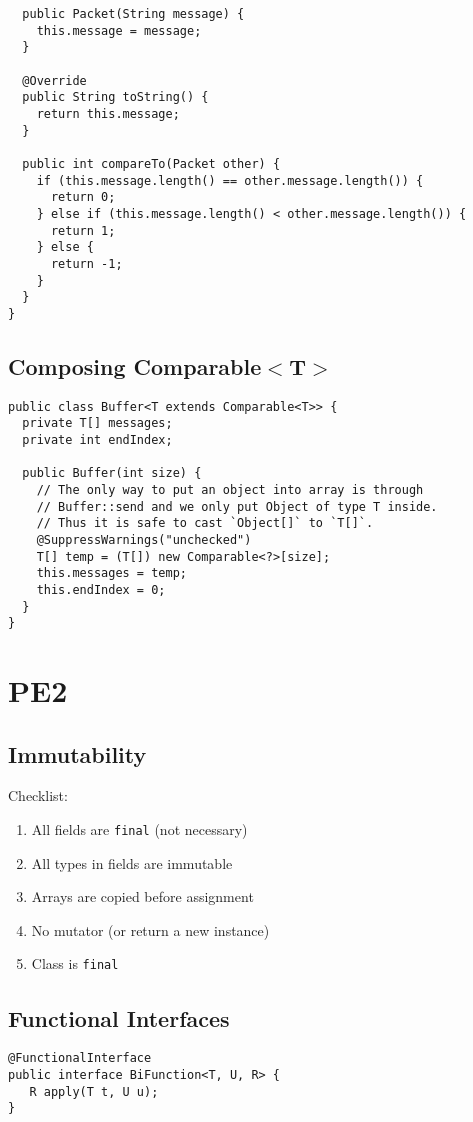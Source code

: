\documentclass[12pt, a4paper]{article}
\begin{document}
\begin{multicols*}{2}
\begin{lstlisting}
  public Packet(String message) {
    this.message = message;
  }

  @Override
  public String toString() {
    return this.message;
  }

  public int compareTo(Packet other) {
    if (this.message.length() == other.message.length()) {
      return 0;
    } else if (this.message.length() < other.message.length()) {
      return 1;
    } else {
      return -1;
    }
  }
}
\end{lstlisting}

\subsection{Composing Comparable$<$T$>$}
\begin{lstlisting}
public class Buffer<T extends Comparable<T>> {
  private T[] messages;
  private int endIndex;

  public Buffer(int size) {
    // The only way to put an object into array is through
    // Buffer::send and we only put Object of type T inside.
    // Thus it is safe to cast `Object[]` to `T[]`.
    @SuppressWarnings("unchecked")
    T[] temp = (T[]) new Comparable<?>[size];
    this.messages = temp;
    this.endIndex = 0;
  }
}
\end{lstlisting}

\section{PE2}
\subsection{Immutability}
Checklist:
\begin{enumerate}[\roman*.]
  \item All fields are \lstinline|final| (not necessary)
  \item All types in fields are immutable
  \item Arrays are copied before assignment
  \item No mutator (or return a new instance)
  \item Class is \lstinline|final|
\end{enumerate}

\subsection{Functional Interfaces}
\begin{lstlisting}
@FunctionalInterface
public interface BiFunction<T, U, R> {
   R apply(T t, U u);
}
\end{lstlisting}


\end{multicols*}
\end{document}
